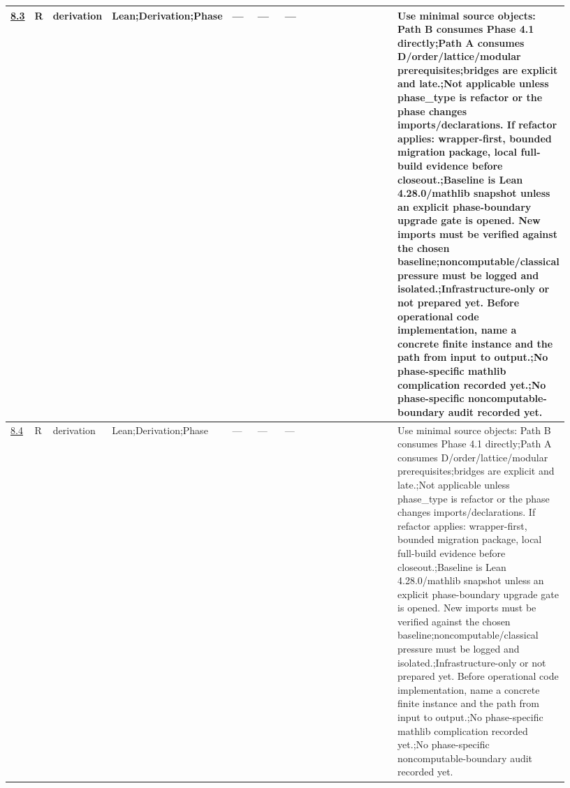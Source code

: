 \begin{longtable}{L{0.026\linewidth} L{0.024\linewidth} L{0.045\linewidth} L{0.07\linewidth} L{0.065\linewidth} L{0.075\linewidth} L{0.11\linewidth} L{0.19\linewidth} L{0.155\linewidth} L{0.17\linewidth}}
\hyperlink{phase-row-8-3}{8.3} & R & derivation & Lean;\newline Derivation;\newline Phase & --- & --- & --- &  &  & Use minimal source objects: Path B consumes Phase 4.1 directly;\newline Path A consumes D/\allowbreak{}order/\allowbreak{}lattice/\allowbreak{}modular prerequisites;\newline bridges are explicit and late.;\newline Not applicable unless phase\_type is refactor or the phase changes imports/\allowbreak{}declarations. If refactor applies: wrapper-first, bounded migration package, local full-build evidence before closeout.;\newline Baseline is Lean 4.28.0/\allowbreak{}mathlib snapshot unless an explicit phase-boundary upgrade gate is opened. New imports must be verified against the chosen baseline;\newline noncomputable/\allowbreak{}classical pressure must be logged and isolated.;\newline Infrastructure-only or not prepared yet. Before operational code implementation, name a concrete finite instance and the path from input to output.;\newline No phase-specific mathlib complication recorded yet.;\newline No phase-specific noncomputable-boundary audit recorded yet.\\
\hline
\addlinespace[0.24em]
\hyperlink{phase-row-8-4}{8.4} & R & derivation & Lean;\newline Derivation;\newline Phase & --- & --- & --- &  &  & Use minimal source objects: Path B consumes Phase 4.1 directly;\newline Path A consumes D/\allowbreak{}order/\allowbreak{}lattice/\allowbreak{}modular prerequisites;\newline bridges are explicit and late.;\newline Not applicable unless phase\_type is refactor or the phase changes imports/\allowbreak{}declarations. If refactor applies: wrapper-first, bounded migration package, local full-build evidence before closeout.;\newline Baseline is Lean 4.28.0/\allowbreak{}mathlib snapshot unless an explicit phase-boundary upgrade gate is opened. New imports must be verified against the chosen baseline;\newline noncomputable/\allowbreak{}classical pressure must be logged and isolated.;\newline Infrastructure-only or not prepared yet. Before operational code implementation, name a concrete finite instance and the path from input to output.;\newline No phase-specific mathlib complication recorded yet.;\newline No phase-specific noncomputable-boundary audit recorded yet.\\

\end{longtable}

